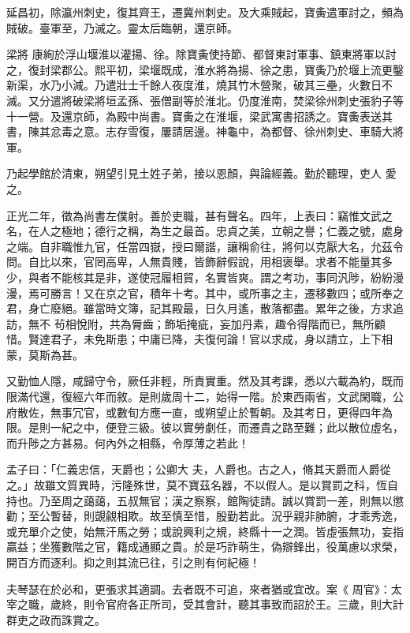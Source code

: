 \begin{pinyinscope}
 延昌初，除瀛州刺史，復其齊王，遷冀州刺史。及大乘賊起，寶夤遣軍討之，頻為賊破。臺軍至，乃滅之。靈太后臨朝，還京師。



 梁將
 康絢於浮山堰淮以灌揚、徐。除寶夤使持節、都督東討軍事、鎮東將軍以討之，復封梁郡公。熙平初，梁堰既成，淮水將為揚、徐之患，寶夤乃於堰上流更鑿新渠，水乃小減。乃遣壯士千餘人夜度淮，燒其竹木營聚，破其三壘，火數日不滅。又分遣將破梁將垣孟孫、張僧副等於淮北。仍度淮南，焚梁徐州刺史張豹子等十一營。及還京師，為殿中尚書。寶夤之在淮堰，梁武寓書招誘之。寶夤表送其書，陳其忿毒之意。志存雪復，屢請居邊。神龜中，為都督、徐州刺史、車騎大將軍。



 乃起學館於清東，朔望引見土姓子弟，接以恩顏，與論經義。勤於聽理，吏人
 愛之。



 正光二年，徵為尚書左僕射。善於吏職，甚有聲名。四年，上表曰：竊惟文武之名，在人之極地；德行之稱，為生之最首。忠貞之美，立朝之譽；仁義之號，處身之端。自非職惟九官，任當四嶽，授曰爾諧，讓稱俞往，將何以克厭大名，允茲令問。自比以來，官罔高卑，人無貴賤，皆飾辭假說，用相褒舉。求者不能量其多少，與者不能核其是非，遂使冠履相貿，名實皆爽。謂之考功，事同汎陟，紛紛漫漫，焉可勝言！又在京之官，積年十考。其中，或所事之主，遷移數四；或所奉之君，身亡廢絕。雖當時文簿，記其殿最，日久月遙，散落都盡。累年之後，方求追訪，無不
 茍相悅附，共為脣齒；飾垢掩疵，妄加丹素，趣令得階而已，無所顧惜。賢達君子，未免斯患；中庸已降，夫復何論！官以求成，身以請立，上下相蒙，莫斯為甚。



 又勤恤人隱，咸歸守令，厥任非輕，所責實重。然及其考課，悉以六載為約，既而限滿代還，復經六年而敘。是則歲周十二，始得一階。於東西兩省，文武閑職，公府散佐，無事冗官，或數旬方應一直，或朔望止於暫朝。及其考日，更得四年為限。是則一紀之中，便登三級。彼以實勞劇任，而遷貴之路至難；此以散位虛名，而升陟之方甚易。何內外之相縣，令厚薄之若此！



 孟子曰：「仁義忠信，天爵也；公卿大
 夫，人爵也。古之人，脩其天爵而人爵從之。」故雖文質異時，污隆殊世，莫不寶茲名器，不以假人。是以賞罰之科，恆自持也。乃至周之藹藹，五叔無官；漢之察察，館陶徒請。誠以賞罰一差，則無以懲勸；至公暫替，則覬覦相欺。故至慎至惜，殷勤若此。況乎親非肺腑，才乖秀逸，或充單介之使，始無汗馬之勞；或說興利之規，終縣十一之潤。皆虛張無功，妄指贏益；坐獲數階之官，籍成通顯之貴。於是巧詐萌生，偽辯鋒出，役萬慮以求榮，開百方而逐利。抑之則其流已往，引之則有何紀極！



 夫琴瑟在於必和，更張求其適調。去者既不可追，來者猶或宜改。案《
 周官》：太宰之職，歲終，則令官府各正所司，受其會計，聽其事致而詔於王。三歲，則大計群吏之政而誅賞之。




\end{pinyinscope}
